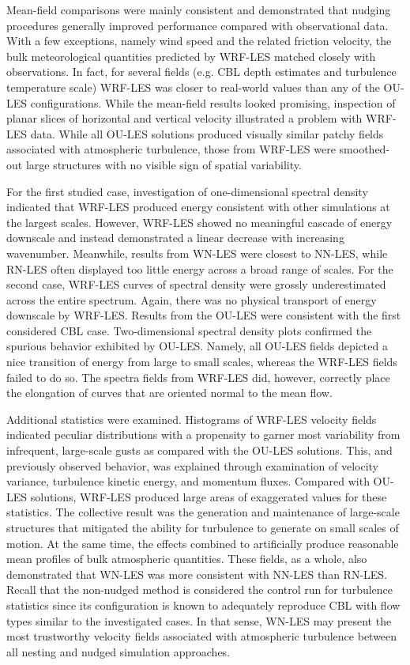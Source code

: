Mean-field comparisons were mainly consistent and demonstrated that nudging procedures generally improved performance compared with observational data. With a few exceptions, namely wind speed and the related friction velocity, the bulk meteorological quantities predicted by WRF-LES matched closely with observations. In fact, for several fields (e.g. CBL depth estimates and turbulence temperature scale) WRF-LES was closer to real-world values than any of the OU-LES configurations. While the mean-field results looked promising, inspection of planar slices of horizontal and vertical velocity illustrated a problem with WRF-LES data. While all OU-LES solutions produced visually similar patchy fields associated with atmospheric turbulence, those from WRF-LES were smoothed-out large structures with no visible sign of spatial variability. 

For the first studied case, investigation of one-dimensional spectral density indicated that WRF-LES produced energy consistent with other simulations at the largest scales. However, WRF-LES showed no meaningful cascade of energy downscale and instead demonstrated a linear decrease with increasing wavenumber. Meanwhile, results from WN-LES were closest to NN-LES, while RN-LES often displayed too little energy across a broad range of scales. For the second case, WRF-LES curves of spectral density were grossly underestimated across the entire spectrum. Again, there was no physical transport of energy downscale by WRF-LES. Results from the OU-LES were consistent with the first considered CBL case. Two-dimensional spectral density plots confirmed the spurious behavior exhibited by OU-LES. Namely, all OU-LES fields depicted a nice transition of energy from large to small scales, whereas the WRF-LES fields failed to do so. The spectra fields from WRF-LES did, however, correctly place the elongation of curves that are oriented normal to the mean flow. 

Additional statistics were examined. Histograms of WRF-LES velocity fields indicated peculiar distributions with a propensity to garner most variability from infrequent, large-scale gusts as compared with the OU-LES solutions. This, and previously observed behavior, was explained through examination of velocity variance, turbulence kinetic energy, and momentum fluxes. Compared with OU-LES solutions, WRF-LES produced large areas of exaggerated values for these statistics. The collective result was the generation and maintenance of large-scale structures that mitigated the ability for turbulence to generate on small scales of motion. At the same time, the effects combined to artificially produce reasonable mean profiles of bulk atmospheric quantities. These fields, as a whole, also demonstrated that WN-LES was more consistent with NN-LES than RN-LES. Recall that the non-nudged method is considered the control run for turbulence statistics since its configuration is known to adequately reproduce CBL with flow types similar to the investigated cases. In that sense, WN-LES may present the most trustworthy velocity fields associated with atmospheric turbulence between all nesting and nudged simulation approaches.

